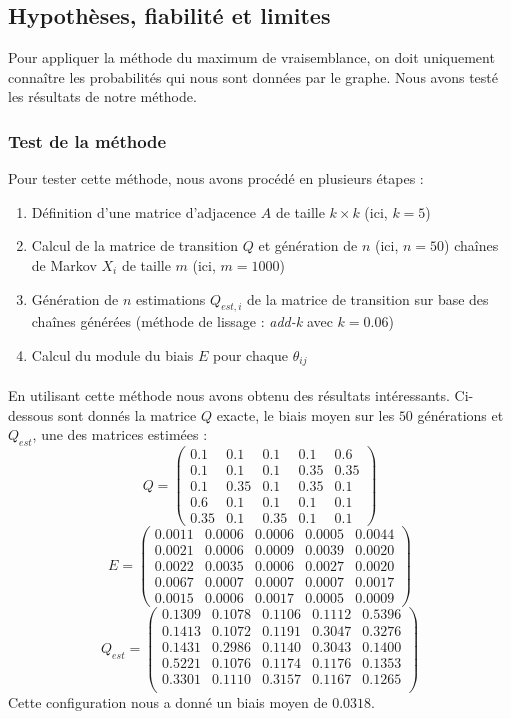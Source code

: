\documentclass[a4paper,titlepage]{report}
\begin{document}
\subsection{Hypothèses, fiabilité et limites}
Pour appliquer la méthode du maximum de vraisemblance, on doit uniquement connaître les probabilités qui nous sont données par le graphe. Nous avons testé les résultats de notre méthode. 

\subsubsection{Test de la méthode}
Pour tester cette méthode, nous avons procédé en plusieurs étapes : 
\begin{enumerate}
	\item Définition d'une matrice d'adjacence $A$ de taille $k \times k$ (ici, $k = 5$)
	\item Calcul de la matrice de transition $Q$ et génération de $n$ (ici, $n = 50$) chaînes de Markov $X_i$ de taille $m$ (ici, $m = 1000$)
	\item Génération de $n$ estimations $Q_{est,i}$ de la matrice de transition sur base des chaînes générées (méthode de lissage : \textit{add-k} avec $k = 0.06$)
	\item Calcul du module du biais $E$ pour chaque $\theta_{ij}$ 
\end{enumerate}
\paragraph{}
En utilisant cette méthode nous avons obtenu des résultats intéressants. Ci-dessous sont donnés la matrice $Q$ exacte, le biais moyen sur les $50$ générations et $Q_{est}$, une des matrices estimées :
\[
Q = 
\begin{pmatrix}
 0.1 & 0.1 & 0.1 & 0.1 & 0.6\\
 0.1 & 0.1 & 0.1 & 0.35 & 0.35\\
 0.1 & 0.35 & 0.1 & 0.35 & 0.1\\
 0.6 & 0.1 & 0.1 & 0.1 & 0.1\\
 0.35 & 0.1 & 0.35 & 0.1 & 0.1 
\end{pmatrix}
\]
\[
E = 
\begin{pmatrix}
0.0011 & 0.0006 & 0.0006 & 0.0005 & 0.0044\\
0.0021 & 0.0006 & 0.0009 & 0.0039 & 0.0020\\
0.0022 & 0.0035 & 0.0006 & 0.0027 & 0.0020\\
0.0067 & 0.0007 & 0.0007 & 0.0007 & 0.0017\\
0.0015 & 0.0006 & 0.0017 & 0.0005 & 0.0009 
\end{pmatrix}
\]
\[
Q_{est} = 
\begin{pmatrix}
0.1309 & 0.1078 & 0.1106 & 0.1112 & 0.5396\\
0.1413 & 0.1072 & 0.1191 & 0.3047 & 0.3276\\
0.1431 & 0.2986 & 0.1140 & 0.3043 & 0.1400\\
0.5221 & 0.1076 & 0.1174 & 0.1176 & 0.1353\\
0.3301 & 0.1110 & 0.3157 & 0.1167 & 0.1265\\
\end{pmatrix}
\]
Cette configuration nous a donné un biais moyen de $0.0318$.
\end{document}
